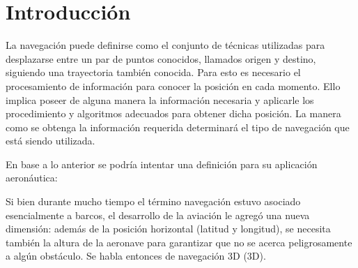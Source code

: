 \section{Introducci\'on}

La navegaci\'on puede definirse como el conjunto de t\'ecnicas utilizadas para desplazarse entre un par de puntos conocidos, llamados origen y destino, siguiendo una \gls{trayectoria} tambi\'en conocida. Para esto es necesario el procesamiento de informaci\'on para conocer la posici\'on en cada momento. Ello implica poseer de alguna manera la informaci\'on necesaria y aplicarle los procedimiento y algoritmos adecuados para obtener dicha posici\'on. La manera como se obtenga la informaci\'on requerida determinar\'a el tipo de navegaci\'on que est\'a siendo utilizada.

En base a lo anterior se podr\'ia intentar una definici\'on para su aplicaci\'on aeron\'autica:

\vspace{3mm}

\begin{center}
\end{center}

\vspace{3mm}


Si bien durante mucho tiempo el t\'ermino navegaci\'on estuvo asociado esencialmente a barcos, el desarrollo de la aviaci\'on le agreg\'o una nueva dimensi\'on: adem\'as de la posici\'on horizontal (\gls{latitud} y \gls{longitud}), se necesita tambi\'en la altura de la aeronave para garantizar que no se acerca peligrosamente a alg\'un obst\'aculo. Se habla entonces de navegaci\'on 3D (\ac{3D}).

